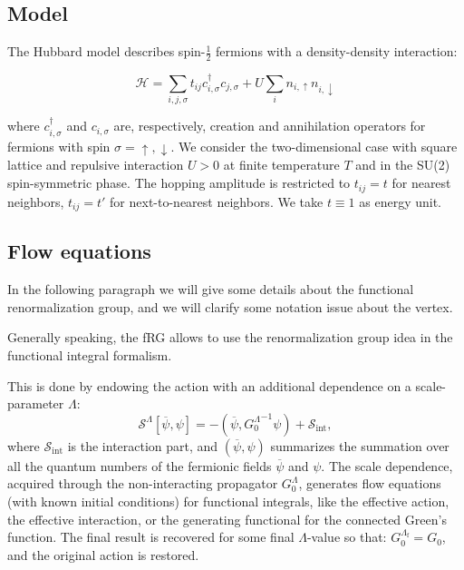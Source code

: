 
\subsection{Model}

The Hubbard model\cite{Hubbard1963} describes spin-$\frac{1}{2}$ fermions with a density-density interaction:

\begin{equation}
\mathcal{H} = \sum_{i,j,\sigma} t_{ij} c^{\dagger}_{i,\sigma} c_{j,\sigma} + U \sum_{i} n_{i,\uparrow} n_{i,\downarrow}
\end{equation}

where $c^{\dagger}_{i,\sigma}$ and $c_{i,\sigma}$ are, respectively, creation and annihilation operators 
for fermions with spin $\sigma=\uparrow,\downarrow$. We consider the two-dimensional case with square lattice and repulsive interaction $U>0$ at finite temperature $T$ and in the SU(2) spin-symmetric phase. The hopping amplitude is restricted to $t_{ij} = t$ for nearest neighbors, $t_{ij}=t'$ for next-to-nearest neighbors. We take $t\equiv1$ as energy unit. 


\subsection{Flow equations}


In the following paragraph we will give some details about the functional renormalization group\cite{Metzner2012,Platt2013}, and we will clarify some notation issue about the vertex. 

Generally speaking, the fRG allows to use the renormalization group idea in the functional integral formalism. 

This is done by endowing the action with an additional dependence on a scale-parameter $\Lambda$:\cite{Metzner2012,Platt2013} 
\begin{equation}
 \mathcal{S}^\Lambda[\overline\psi,\psi]=
-(\overline\psi,{G_0^\Lambda}^{-1}\psi)+\mathcal{S}_{\mathrm{int}},  
\end{equation} 
where $\mathcal{S}_{\mathrm{int}}$ is the interaction part, and $(\overline\psi,\psi)$ summarizes the summation over all the quantum numbers of the fermionic fields  $\overline \psi$ and $\psi$. 
The scale dependence, acquired through the non-interacting propagator $G_0^\Lambda$, generates flow equations\cite{Wetterich1993} (with known initial conditions) for functional integrals, like the effective action, the effective interaction, or the generating functional for the connected Green's function. 
The final result is recovered for some final $\Lambda$-value so that: $G_0^{\Lambda_\mathrm{f}} = G_0$, and the original action is restored.  

